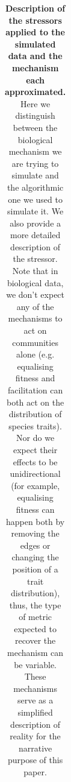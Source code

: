 \documentclass[12pt,letterpaper]{article}
\begin{document}
\begin{table}
\begin{tabular}{p{0.2\linewidth}|p{0.2\linewidth}|p{0.4\linewidth}|p{0.2\linewidth}}
    \end{tabular}
    \caption{\scriptsize{\textbf{Description of the stressors applied to the simulated data and the mechanism each approximated.} Here we distinguish between the biological mechanism we are trying to simulate and the algorithmic one we used to simulate it. We also provide a more detailed description of the stressor. Note that in biological data, we don't expect any of the mechanisms to act on communities alone (e.g. equalising fitness and facilitation can both act on the distribution of species traits). Nor do we expect their effects to be unidirectional (for example, equalising fitness can happen both by removing the edges or changing the position of a trait distribution), thus, the type of metric expected to recover the mechanism can be variable. These mechanisms serve as a simplified description of reality for the narrative purpose of this paper.}
}
    \label{Tab:mechanisms}
\end{table}
\end{document}
